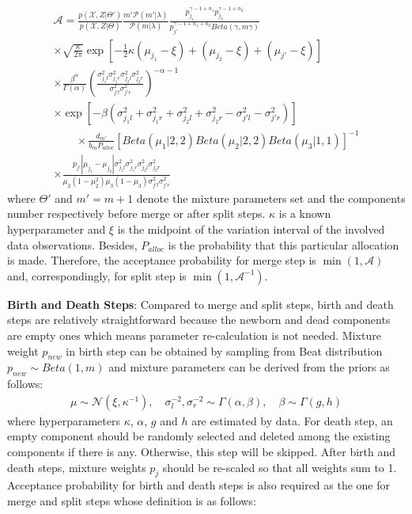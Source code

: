 \documentclass[conference]{IEEEtran}
\begin{document}
\begin{multline}
\mathcal{A}=\frac{p(\mathcal{X},Z|\Theta')}{p(\mathcal{X},Z|\Theta)}\frac{m'\mathcal{P}(m'|\lambda)}{\mathcal{P}(m|\lambda)}\frac{p_{j_1}^{\gamma-1+n_1}p_{j_2}^{\gamma-1+n_2}}{p_{j'}^{\gamma-1+n_1+n_2}Beta(\gamma,m\gamma)} \\
\times \sqrt{\frac{\kappa}{2\pi}} \exp[-\frac{1}{2}\kappa{(\mu_{j_1}-\xi)+(\mu_{j_2}-\xi)+(\mu_{j'}-\xi)}] \\
\times \frac{\beta^{\alpha}}{\Gamma(\alpha)}(\frac{\sigma_{j_1l}^2\sigma_{j_1r}^2\sigma_{j_2l}^2\sigma_{j_2r}^2}{\sigma_{j'l}^2\sigma_{j'r}^2})^{-\alpha-1} \qquad\qquad\qquad\qquad\\
\times \exp [{-\beta(\sigma_{j_1l}^2+\sigma_{j_1r}^2+\sigma_{j_2l}^2+\sigma_{j_2r}^2-\sigma_{j'l}^2-\sigma_{j'r}^2)}] \\
\qquad\times \frac{d_{m'}}{b_mP_{alloc}} [Beta(\mu_1|2,2)Beta(\mu_2|2,2)Beta(\mu_3|1,1)]^{-1} \\
\times \frac{p_{j'}|\mu_{j_1}-\mu_{j_2}|\sigma_{j_1l}^2\sigma_{j_1r}^2\sigma_{j_2l}^2\sigma_{j_2r}^2}{\mu_2(1-\mu_2^2)\mu_3(1-\mu_3)\sigma_{j'l}^2\sigma_{j'r}^2} \qquad\qquad\qquad\quad
\label{eq:acptProMS}
\end{multline}
where $\Theta'$ and $m' = m + 1$ denote the mixture parameters set and the components number respectively before merge or after split steps. $\kappa$ is a known hyperparameter and $\xi$ is the midpoint of the variation interval of the involved data observations. Besides, $P_{alloc}$ is the probability that this particular allocation is made. Therefore, the acceptance probability for merge step is $\min(1,\mathcal{A})$ and, correspondingly, for split step is $\min(1,\mathcal{A}^{-1})$.

\textbf{Birth and Death Steps}: Compared to merge and split steps, birth and death steps are relatively straightforward because the newborn and dead components are empty ones which means parameter re-calculation is not needed. Mixture weight $p_{new}$ in birth step can be obtained by sampling from Beat distribution $p_{new} \sim Beta(1,m)$ and mixture parameters can be derived from the priors as follows\cite{Casella2004}:
\begin{align}
\mu \sim \mathcal{N}(\xi,\kappa^{-1}), \quad \sigma_{l}^{-2},\sigma_{r}^{-2} \sim \Gamma(\alpha,\beta), \quad \beta \sim \Gamma(g,h)
\label{eq:prior}
\end{align}
where hyperparameters $\kappa$, $\alpha$, $g$ and $h$ are estimated by data. For death step, an empty component should be randomly selected and deleted among the existing components if there is any. Otherwise, this step will be skipped. After birth and death steps, mixture weights $p_j$ should be re-scaled so that all weights sum to 1. Acceptance probability for birth and death steps is also required as the one for merge and split steps whose definition is as follows:
\end{document}
